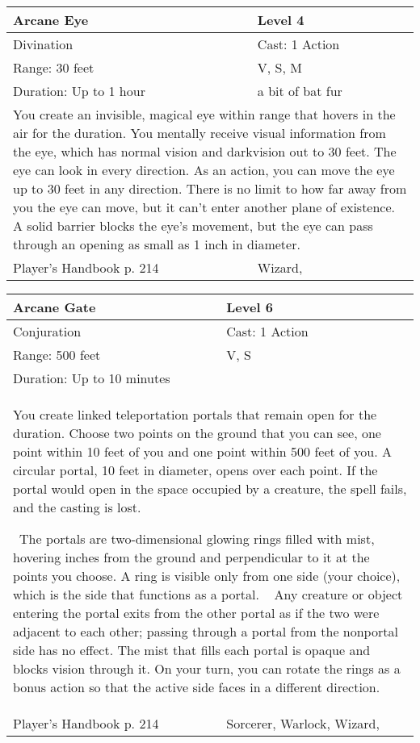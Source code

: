 \documentclass[11pt]{report}
\begin{document}
\begin{table}[H]
	\begin{tabular}{||p{6cm}|p{6cm}||}
		\hline\hline
		\bf{Arcane Eye} & Level 4\\ \hline
		Divination & Cast: 1 Action\\ \hline
		Range: 30 feet & V, S, M\\ \hline
		Duration: Up to 1 hour & a bit of bat fur\\ \hline
		\multicolumn{2}{||p{12cm}||}{You create an invisible, magical eye within range that hovers in the air for the duration. 
You mentally receive visual information from the eye, which has normal vision and darkvision out to 30 feet. The eye can look in every direction. 
As an action, you can move the eye up to 30 feet in any direction. There is no limit to how far away from you the eye can move, but it can’t enter another plane of existence. A solid barrier blocks the eye’s movement, but the eye can pass through an opening as small as 1 inch in diameter.}\\ \hline
Player's Handbook p. 214 & Wizard, \\ \hline\hline
	\end{tabular}
\end{table}

\begin{table}[H]
	\begin{tabular}{||p{6cm}|p{6cm}||}
		\hline\hline
		\bf{Arcane Gate} & Level 6\\ \hline
		Conjuration & Cast: 1 Action\\ \hline
		Range: 500 feet & V, S\\ \hline
		Duration: Up to 10 minutes & \\ \hline
		\multicolumn{2}{||p{12cm}||}{You create linked teleportation portals that remain open for the duration. 
Choose two points on the ground that you can see, one point within 10 feet of you and one point within 500 feet of you. A circular portal, 10 feet in diameter, opens over each point. If the portal would open in the space occupied by a creature, the spell fails, and the casting is lost. 

 The portals are two-dimensional glowing rings filled with mist, hovering inches from the ground and perpendicular to it at the points you choose. A ring is visible only from one side (your choice), which is the side that functions as a portal. 
 
Any creature or object entering the portal exits from the other portal as if the two were adjacent to each other; passing through a portal from the nonportal side has no effect. The mist that fills each portal is opaque and blocks vision through it. On your turn, you can rotate the rings as a bonus action so that the active side faces in a different direction.}\\ \hline
Player's Handbook p. 214 & Sorcerer, Warlock, Wizard, \\ \hline\hline
	\end{tabular}
\end{table}
\end{document}
